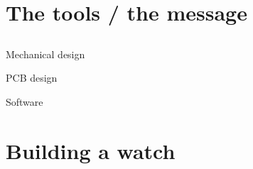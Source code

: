 \documentclass[compress,red]{beamer}
\begin{document}
\section{The tools / the message}

\subsection*{} %

\begin{frame}{Mechanical design}


  \note[item]{}

\end{frame}

\begin{frame}{PCB design}

  \begin{center}
  \end{center}

  \note[item]{}

\end{frame}

\begin{frame}{Software}

  \begin{center}
  \end{center}

  \note[item]{}

\end{frame}


\section{Building a watch}

\subsection*{} %
\end{document}
